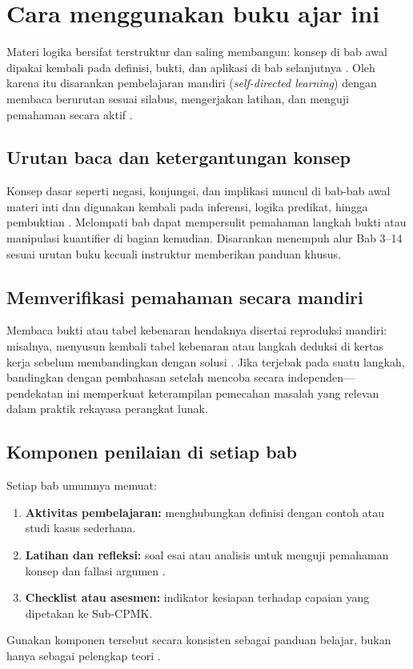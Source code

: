 \section{Cara menggunakan buku ajar ini}

Materi logika bersifat terstruktur dan saling membangun: konsep di bab awal dipakai kembali pada definisi, bukti, dan aplikasi di bab selanjutnya \cite{levin_discrete}. Oleh karena itu disarankan pembelajaran mandiri (\textit{self-directed learning}) dengan membaca berurutan sesuai silabus, mengerjakan latihan, dan menguji pemahaman secara aktif \cite{rosen2019,forallx}.

\subsection{Urutan baca dan ketergantungan konsep}

Konsep dasar seperti negasi, konjungsi, dan implikasi muncul di bab-bab awal materi inti dan digunakan kembali pada inferensi, logika predikat, hingga pembuktian \cite{rosen2019,forallx}. Melompati bab dapat mempersulit pemahaman langkah bukti atau manipulasi kuantifier di bagian kemudian. Disarankan menempuh alur Bab 3--14 sesuai urutan buku kecuali instruktur memberikan panduan khusus.

\subsection{Memverifikasi pemahaman secara mandiri}

Membaca bukti atau tabel kebenaran hendaknya disertai reproduksi mandiri: misalnya, menyusun kembali tabel kebenaran atau langkah deduksi di kertas kerja sebelum membandingkan dengan solusi \cite{proofs_checker,carnap}. Jika terjebak pada suatu langkah, bandingkan dengan pembahasan setelah mencoba secara independen---pendekatan ini memperkuat keterampilan pemecahan masalah yang relevan dalam praktik rekayasa perangkat lunak.

\subsection{Komponen penilaian di setiap bab}

Setiap bab umumnya memuat:
\begin{enumerate}
  \item \textbf{Aktivitas pembelajaran:} menghubungkan definisi dengan contoh atau studi kasus sederhana.
  \item \textbf{Latihan dan refleksi:} soal esai atau analisis untuk menguji pemahaman konsep dan fallasi argumen \cite{copi2014}.
  \item \textbf{Checklist atau asesmen:} indikator kesiapan terhadap capaian yang dipetakan ke Sub-CPMK.
\end{enumerate}

Gunakan komponen tersebut secara konsisten sebagai panduan belajar, bukan hanya sebagai pelengkap teori \cite{levin_discrete,stanford_cs103}.
